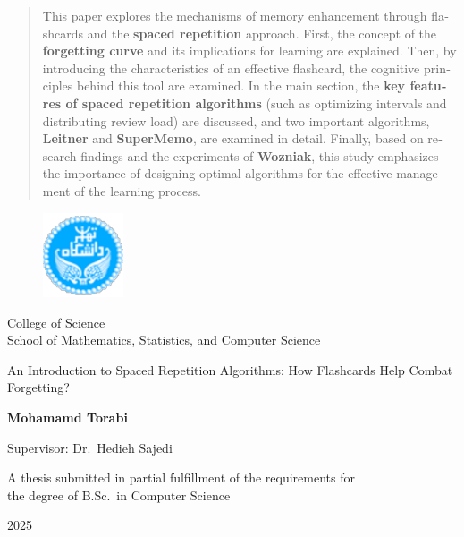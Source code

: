 \documentclass[12pt]{report}
\begin{document}
\begin{latin}
\begin{abstract}
This paper explores the mechanisms of memory enhancement through flashcards and the \textbf{spaced repetition} approach. First, the concept of the \textbf{forgetting curve} and its implications for learning are explained. Then, by introducing the characteristics of an effective flashcard, the cognitive principles behind this tool are examined. In the main section, the \textbf{key features of spaced repetition algorithms} (such as optimizing intervals and distributing review load) are discussed, and two important algorithms, \textbf{Leitner} and \textbf{SuperMemo}, are examined in detail. Finally, based on research findings and the experiments of \textbf{Wozniak}, this study emphasizes the importance of designing optimal algorithms for the effective management of the learning process.
\end{abstract}
\newpage
\thispagestyle{empty}
\begin{figure}
\centering
\includegraphics[height=2.5cm]{UT-Logo.pdf}
\end{figure}
\begin{center}

College of Science\\
School of Mathematics, Statistics, and Computer Science
\end{center}

\begin{center}
\end{center}

\begin{center}
\huge{An Introduction to Spaced Repetition Algorithms: How Flashcards Help Combat Forgetting?

}
\end{center}

\begin{center}
\end{center}

\begin{center}
\textbf{
Mohamamd Torabi
}
\end{center}

\begin{center}
Supervisor: Dr.\ Hedieh Sajedi
\end{center}

\vspace{3cm}
\begin{center}
A thesis submitted in partial fulfillment of the requirements for\\
the degree of B.Sc.\ in Computer Science
\end{center}

\begin{center}
2025
\end{center}


\end{latin}
\end{document}
